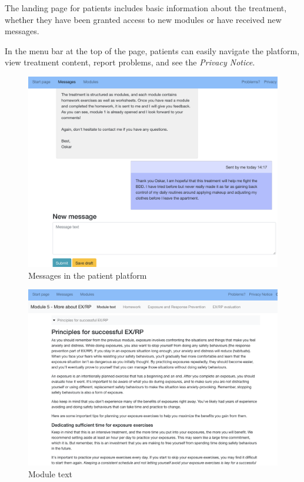 \documentclass[]{book}
\theoremstyle{definition}
\theoremstyle{definition}
\theoremstyle{definition}
\theoremstyle{remark}
\begin{document}
The landing page for patients includes basic information about the
treatment, whether they have been granted access to new modules or have
received new messages.

In the menu bar at the top of the page, patients can easily navigate the
platform, view treatment content, report problems, and see the
\emph{Privacy Notice}.

\begin{figure}
\centering
\includegraphics{images/patient-messages.png}
\caption{Messages in the patient platform}
\end{figure}

\begin{figure}
\centering
\includegraphics{images/patient-moduletext.png}
\caption{Module text}
\end{figure}
\end{document}
